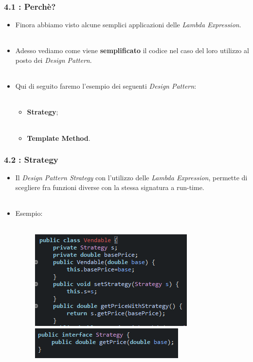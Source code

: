 \documentclass{beamer}
\begin{document}

\begin{frame}[fragile]
	\frametitle{\textbf{4.1 : Perchè?}}
	\begin{itemize}
		\item
			Finora abbiamo visto alcune semplici applicazioni delle \textit{Lambda Expression}.\\\
		\item
			Adesso vediamo come viene \textbf{semplificato} il codice nel caso del loro utilizzo al posto dei \textit{Design Pattern}.\\\
		\item
			Qui di seguito faremo l'esempio dei seguenti \textit{Design Pattern}:\\\
			\begin{itemize}
				\item
					\textbf{Strategy};\\\
				\item
					\textbf{Template Method}.
			\end{itemize}
	\end{itemize}
\end{frame}


\begin{frame}
	\frametitle{\textbf{4.2 : Strategy}}
	\begin{itemize}
		\item
			Il \textit{Design Pattern Strategy} con l'utilizzo delle \textit{Lambda Expression}, permette di scegliere fra funzioni diverse con la stessa signatura a run-time.\\\
		\item
			Esempio:\\\
			\begin{figure}
				\centering
				\includegraphics[width=0.5\linewidth]{image/strategy.png}
				\label{fig:target}
				\centering
				\includegraphics[width=0.4\linewidth]{image/interfaceStrategy.png}
				\label{fig:target}
			\end{figure}		
	\end{itemize}
\end{frame}
\end{document}
